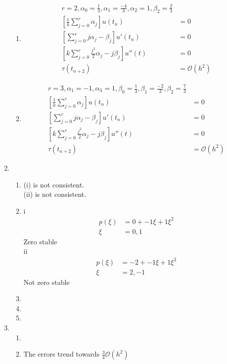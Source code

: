 \documentclass{article}
\begin{document}
\begin{enumerate}
\begin{enumerate}
	\item
		\begin{equation*}
		\begin{split}
		r=2, \alpha_{0} = \frac{1}{3}, \alpha_{1} = \frac{-4}{3}, \alpha_{2} = 1 , \beta_{2} = \frac{2}{3} \\
		[\frac{1}{k} \sum_{j=0}^{r} \alpha_{j}] u(t_{n}) & = 0 \\
		[\sum_{j=0}^{r} j\alpha_{j} - \beta_{j}] u'(t_{n}) & = 0 \\
		[k \sum_{j=0}^{r} \frac{j^{2}}{2} \alpha_{j} - j \beta_{j}] u''(t) & =  0 \\
		\tau(t_{n+2}) & = \mathcal{O}(h^{2}) 
		\end{split}
		\end{equation*}
\item
		\begin{equation*}
		\begin{split}
		r=3, \alpha_{1} = -1, \alpha_{3} = 1, \beta_{0} = \frac{1}{3}, \beta_{1} = \frac{-2}{3}, \beta_{2} = \frac{7}{3} \\
		[\frac{1}{k} \sum_{j=0}^{r} \alpha_{j}] u(t_{n}) & = 0 \\
		[\sum_{j=0}^{r} j\alpha_{j} - \beta_{j}] u'(t_{n}) & = 0 \\
		[k \sum_{j=0}^{r} \frac{j^{2}}{2} \alpha_{j} - j \beta_{j}] u''(t) & =  0 \\
		\tau(t_{n+2}) & = \mathcal{O}(h^{2}) 
		\end{split}
		\end{equation*}
	\end{enumerate}
\item
	\begin{enumerate}
	\item 
(i) is not consistent. \\
(ii) is not consistent.
	\item 
i
		\begin{equation*}
		\begin{split}
		p(\xi) &= 0 + -1\xi + 1\xi^{2} \\
		\xi & = 0,1
		\end{split}
		\end{equation*}
Zero stable \\
ii
		\begin{equation*}
		\begin{split}
		p(\xi) &= -2 + -1\xi + 1\xi^{2} \\
		\xi & = 2, -1
		\end{split}
		\end{equation*}
Not zero stable
	\item
	\item
	\item
	\end{enumerate}
\item
\begin{enumerate}
\item
\item
The errors trend towards $\frac{3}{4}\mathcal{O}(h^{2})$ 
\end{enumerate}
\end{enumerate}
\end{document}
